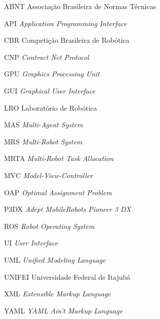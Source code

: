 \renewcommand{\nomname}{\listadesiglasname}
\pdfbookmark[0]{\nomname}{las}
\cleardoublepage
\begin{siglas}
    \item[ABNT] Associação Brasileira de Normas Técnicas
    \item[API] \textit{Application Programming Interface}
    \item[CBR] Competição Brasileira de Robótica
    \item[CNP] \textit{Contract Net Protocol}
    \item[GPU] \textit{Graphics Processing Unit}
    \item[GUI] \textit{Graphical User Interface}
    \item[LRO] Laboratório de Robótica
    \item[MAS] \textit{Multi-Agent System}
    \item[MRS] \textit{Multi-Robot System}
    \item[MRTA] \textit{Multi-Robot Task Allocation}
    \item[MVC] \textit{Model-View-Controller}
    \item[OAP] \textit{Optimal Assignment Problem}
    \item[P3DX] \textit{Adept MobileRobots Pioneer 3 DX}
    \item[ROS] \textit{Robot Operating System}
    \item[UI] \textit{User Interface}
    \item[UML] \textit{Unified Modeling Language}
    \item[UNIFEI] Universidade Federal de Itajubá
    \item[XML] \textit{Extensible Markup Language}
    \item[YAML] \textit{YAML Ain't Markup Language}
\end{siglas}